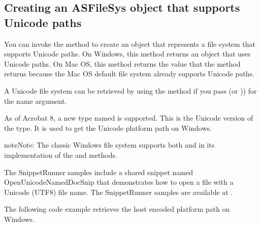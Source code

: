 \documentclass[letterpaper,12pt,english,openany,oneside]{sphinxmanual}
\begin{document}
\subsection{Creating an ASFileSys object that supports Unicode paths}
\label{\detokenize{Plugins_Unicode:creating-an-asfilesys-object-that-supports-unicode-paths}}
You can invoke the  method to create an  object that represents a file system that supports Unicode paths. On Windows, this method returns an  object that uses Unicode paths. On Mac OS, this method returns the value that the  method returns because the Mac OS default file system already supports Unicode paths.

A Unicode file system can be retrieved by using the  method if you pass  (or  )) for the  name argument.

As of Acrobat 8, a new  type named  is supported. This is the Unicode version of the  type. It is used to get the Unicode platform path on Windows.

\begin{sphinxadmonition}{note}{Note:}
The classic Windows file system supports both  and  in its implementation of the  and  methods.
\end{sphinxadmonition}

The SnippetRunner samples include a shared snippet named OpenUnicodeNamedDocSnip that demonstrates how to open a file with a Unicode (UTF\sphinxhyphen{}8) file name. The SnippetRunner samples are available at .

The following code example retrieves the host encoded platform path on Windows.
\end{document}
